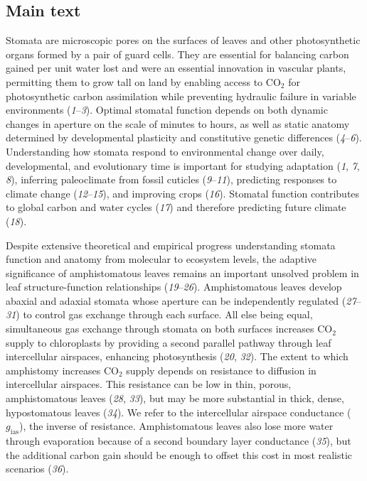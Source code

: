 \documentclass[
  letterpaper,
  DIV=11,
  numbers=noendperiod]{scrartcl}
\newcommand{\gias}{$g_\text{ias}$}
\begin{document}
\subsection{Main text}\label{main-text}

Stomata are microscopic pores on the surfaces of leaves and other
photosynthetic organs formed by a pair of guard cells. They are
essential for balancing carbon gained per unit water lost and were an
essential innovation in vascular plants, permitting them to grow tall on
land by enabling access to CO\(_2\) for photosynthetic carbon
assimilation while preventing hydraulic failure in variable environments
(\emph{1}--\emph{3}). Optimal stomatal function depends on both dynamic
changes in aperture on the scale of minutes to hours, as well as static
anatomy determined by developmental plasticity and constitutive genetic
differences (\emph{4}--\emph{6}). Understanding how stomata respond to
environmental change over daily, developmental, and evolutionary time is
important for studying adaptation (\emph{1}, \emph{7}, \emph{8}),
inferring paleoclimate from fossil cuticles (\emph{9}--\emph{11}),
predicting responses to climate change (\emph{12}--\emph{15}), and
improving crops (\emph{16}). Stomatal function contributes to global
carbon and water cycles (\emph{17}) and therefore predicting future
climate (\emph{18}).

Despite extensive theoretical and empirical progress understanding
stomata function and anatomy from molecular to ecosystem levels, the
adaptive significance of amphistomatous leaves remains an important
unsolved problem in leaf structure-function relationships
(\emph{19}--\emph{26}). Amphistomatous leaves develop abaxial and
adaxial stomata whose aperture can be independently regulated
(\emph{27}--\emph{31}) to control gas exchange through each surface. All
else being equal, simultaneous gas exchange through stomata on both
surfaces increases CO\(_2\) supply to chloroplasts by providing a second
parallel pathway through leaf intercellular airspaces, enhancing
photosynthesis (\emph{20}, \emph{32}). The extent to which amphistomy
increases CO\(_2\) supply depends on resistance to diffusion in
intercellular airspaces. This resistance can be low in thin, porous,
amphistomatous leaves (\emph{28}, \emph{33}), but may be more
substantial in thick, dense, hypostomatous leaves (\emph{34}). We refer
to the intercellular airspace conductance (\gias), the inverse of
resistance. Amphistomatous leaves also lose more water through
evaporation because of a second boundary layer conductance (\emph{35}),
but the additional carbon gain should be enough to offset this cost in
most realistic scenarios (\emph{36}).
\end{document}
